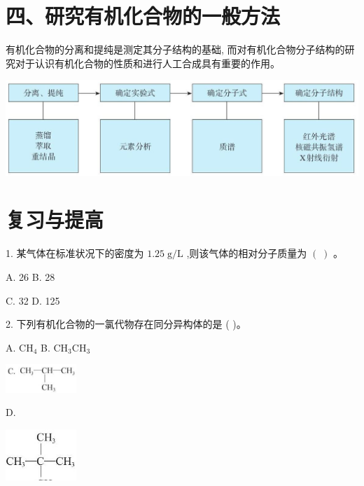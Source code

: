 \documentclass[10pt]{article}
\begin{document}
\section*{四、研究有机化合物的一般方法}

有机化合物的分离和提纯是测定其分子结构的基础, 而对有机化合物分子结构的研究对于认识有机化合物的性质和进行人工合成具有重要的作用。

\begin{center}
\includegraphics[max width=1.0\textwidth]{images/0190efc5-b58a-7c43-bfb0-e0a030df9cfd_30_344532.jpg}
\end{center}

\section*{复习与提高}

1. 某气体在标准状况下的密度为 \({1.25}\mathrm{\;g}/\mathrm{L}\) ,则该气体的相对分子质量为 \(\left( \;\right)\) 。

A. 26 B. 28

C. 32 D. 125

2. 下列有机化合物的一氯代物存在同分异构体的是 ( )。

A. \({\mathrm{{CH}}}_{4}\) B. \({\mathrm{{CH}}}_{3}{\mathrm{{CH}}}_{3}\)

\begin{center}
\includegraphics[max width=0.2\textwidth]{images/0190efc5-b58a-7c43-bfb0-e0a030df9cfd_30_197570.jpg}
\end{center}

D.

\begin{center}
\includegraphics[max width=0.2\textwidth]{images/0190efc5-b58a-7c43-bfb0-e0a030df9cfd_30_481952.jpg}
\end{center}
\end{document}
